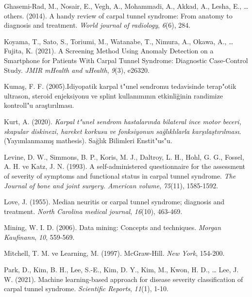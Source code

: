 \documentclass[12pt,twoside]{deuthesis}
\begin{document}
\begin{CSLReferences}{1}{0}
\leavevmode{}%
Ghasemi-Rad, M., Nosair, E., Vegh, A., Mohammadi, A., Akkad, A., Lesha, E., \ldots{} others. (2014). A handy review of carpal tunnel syndrome: From anatomy to diagnosis and treatment. \emph{World journal of radiology}, \emph{6}(6), 284.

\leavevmode{}%
Koyama, T., Sato, S., Toriumi, M., Watanabe, T., Nimura, A., Okawa, A., \ldots{} Fujita, K. (2021). A Screening Method Using Anomaly Detection on a Smartphone for Patients With Carpal Tunnel Syndrome: Diagnostic Case-Control Study. \emph{JMIR mHealth and uHealth}, \emph{9}(3), e26320.

\leavevmode{}%
Kumaş, F. F. (2005).{I}diyopatik karpal t{"u}nel sendromu tedavisinde terap{"o}tik ultrason, steroid enjeksiyonu ve splint kullan{ı}m{ı}n{ı}n etkinli{ğ}inin randimize kontroll{"u} ara{ş}t{ı}r{ı}lmas{ı}.

\leavevmode{}%
Kurt, A. (2020). \emph{Karpal t{"u}nel sendrom hastalar{ı}nda bilateral ince motor beceri, skapular diskinezi, hareket korkusu ve fonksiyonun sa{ğ}l{ı}kl{ı}larla kar{ş}{ı}la{ş}t{ı}r{ı}lmas{ı}}. (Yayımlanmamış mathesis). Sa{ğ}l{ı}k Bilimleri Enstit{"u}s{"u}.

\leavevmode{}%
Levine, D. W., Simmons, B. P., Koris, M. J., Daltroy, L. H., Hohl, G. G., Fossel, A. H. ve Katz, J. N. (1993). A self-administered questionnaire for the assessment of severity of symptoms and functional status in carpal tunnel syndrome. \emph{The Journal of bone and joint surgery. American volume}, \emph{75}(11), 1585-1592.

\leavevmode{}%
Love, J. (1955). Median neuritis or carpal tunnel syndrome; diagnosis and treatment. \emph{North Carolina medical journal}, \emph{16}(10), 463-469.

\leavevmode{}%
Mining, W. I. D. (2006). Data mining: Concepts and techniques. \emph{Morgan Kaufinann}, \emph{10}, 559-569.

\leavevmode{}%
Mitchell, T. M. ve Learning, M. (1997). McGraw-Hill. \emph{New York}, 154-200.

\leavevmode{}%
Park, D., Kim, B. H., Lee, S.-E., Kim, D. Y., Kim, M., Kwon, H. D., \ldots{} Lee, J. W. (2021). Machine learning-based approach for disease severity classification of carpal tunnel syndrome. \emph{Scientific Reports}, \emph{11}(1), 1-10.


\end{CSLReferences}
\end{document}
